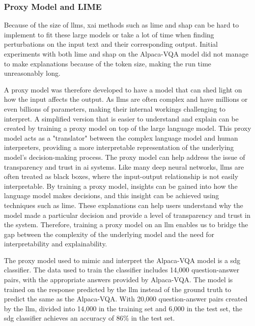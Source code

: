         \subsubsection{Proxy Model and LIME}
        Because of the size of \glspl{llm}, \gls{xai} methods such as \gls{lime} and \gls{shap} can be hard to implement to fit these large models or take a lot of time when finding perturbations on the input text and their corresponding output. Initial experiments with both \gls{lime} and \gls{shap} on the Alpaca-VQA model did not manage to make explanations because of the token size, making the run time unreasonably long.
        
        
        A proxy model was therefore developed to have a model that can shed light on how the input affects the output. 
        As \glspl{llm} are often complex and have millions or even billions of parameters, making their internal workings challenging to interpret. A simplified version that is easier to understand and explain can be created by training a proxy model on top of the large language model. This proxy model acts as a "translator" between the complex language model and human interpreters, providing a more interpretable representation of the underlying model's decision-making process.
        The proxy model can help address the issue of transparency and trust in \gls{ai} systems. Like many deep neural networks, \glspl{llm} are often treated as black boxes, where the input-output relationship is not easily interpretable. By training a proxy model, insights can be gained into how the language model makes decisions, and this insight can be achieved using techniques such as \gls{lime}. 
        These explanations can help users understand why the model made a particular decision and provide a level of transparency and trust in the system.
        Therefore, training a proxy model on an \gls{llm} enables us to bridge the gap between the complexity of the underlying model and the need for interpretability and explainability.

        The proxy model used to mimic and interpret the Alpaca-VQA model is a \gls{sdg} classifier. 
        The data used to train the classifier includes 14,000 question-answer pairs, with the appropriate answers provided by Alpaca-VQA. The model is trained on the response predicted by the \gls{llm} instead of the ground truth to predict the same as the Alpaca-VQA. With 20,000 question-answer pairs created by the \gls{llm}, divided into 14,000 in the training set and 6,000 in the test set, the \gls{sdg} classifier achieves an accuracy of 86\% in the test set.
        
